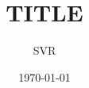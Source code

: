 \documentclass[9pt]{extarticle}
\title{TITLE}
\author{SVR}
\date{\today}
\begin{document}
\maketitle



\lipsum



\end{document}
